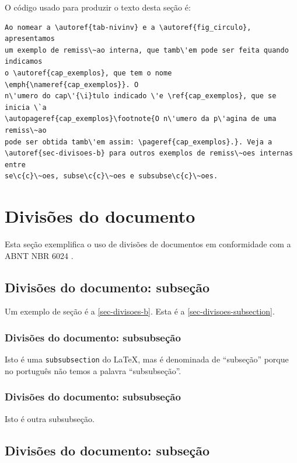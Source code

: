 O c\'odigo usado para produzir o texto desta se\c{c}\~ao \'e:

\begin{verbatim}
Ao nomear a \autoref{tab-nivinv} e a \autoref{fig_circulo}, apresentamos 
um exemplo de remiss\~ao interna, que tamb\'em pode ser feita quando indicamos 
o \autoref{cap_exemplos}, que tem o nome \emph{\nameref{cap_exemplos}}. O
n\'umero do cap\'{\i}tulo indicado \'e \ref{cap_exemplos}, que se inicia \`a 
\autopageref{cap_exemplos}\footnote{O n\'umero da p\'agina de uma remiss\~ao 
pode ser obtida tamb\'em assim: \pageref{cap_exemplos}.}. Veja a 
\autoref{sec-divisoes-b} para outros exemplos de remiss\~oes internas entre 
se\c{c}\~oes, subse\c{c}\~oes e subsubse\c{c}\~oes.
\end{verbatim}

\section{Divis\~oes do documento}\label{sec-divisoes-b}
Esta se\c{c}\~ao exemplifica o uso de divis\~oes de documentos em conformidade com a ABNT NBR 6024  \cite{nbr6024}.
\subsection{Divis\~oes do documento: subse\c{c}\~ao}\label{sec-divisoes-subsection}

Um exemplo de se\c{c}\~ao \'e a \autoref{sec-divisoes-b}. Esta \'e a \autoref{sec-divisoes-subsection}.

\subsubsection{Divis\~oes do documento: subsubse\c{c}\~ao}\label{sec-divisoes-subsubsection}

Isto \'e uma \texttt{subsubsection} do \LaTeX, mas \'e denominada de ``subse\c{c}\~ao'' porque no portugu\^es n\~ao temos a palavra ``subsubse\c{c}\~ao''.

\subsubsection{Divis\~oes do documento: subsubse\c{c}\~ao}

Isto \'e outra subsubse\c{c}\~ao.

\subsection{Divis\~oes do documento: subse\c{c}\~ao}\label{sec-exemplo-subsec}

